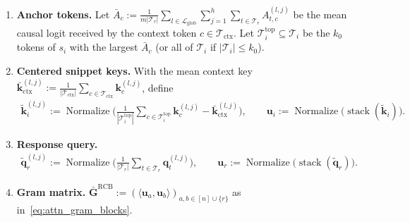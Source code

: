 \documentclass{article}
\begin{document}
\begin{enumerate}
    \item \textbf{Anchor tokens.} Let $\bar{A}_c := \frac{1}{m |\mathcal{T}_r|} \sum_{l \in \mathcal{L}_{\text{glob}}} \sum_{j=1}^{h} \sum_{t \in \mathcal{T}_r} A^{(l,j)}_{t,c}$ be the mean causal logit received by the context token $c \in \mathcal{T}_{\text{ctx}}$. Let $\mathcal{T}_i^{\text{top}} \subseteq \mathcal{T}_i$ be the $k_0$ tokens of $s_i$ with the largest $\bar{A}_c$ (or all of $\mathcal{T}_i$ if $|\mathcal{T}_i| \le k_0$).
    \item \textbf{Centered snippet keys.} With the mean context key $\bar{\mathbf{k}}_{\text{ctx}}^{(l,j)} := \frac{1}{|\mathcal{T}_{\text{ctx}}|} \sum_{c \in \mathcal{T}_{\text{ctx}}} \mathbf{k}_c^{(l,j)}$, define
    \begin{align}
        \tilde{\mathbf{k}}_i^{(l,j)} := \operatorname{Normalize}\Big( \frac{1}{|\mathcal{T}_i^{\text{top}}|} \sum_{c \in \mathcal{T}_i^{\text{top}}} \mathbf{k}_c^{(l,j)} - \bar{\mathbf{k}}_{\text{ctx}}^{(l,j)} \Big), \qquad \mathbf{u}_i := \operatorname{Normalize}\big( \operatorname{stack}(\tilde{\mathbf{k}}_i) \big).
    \end{align}
    \item \textbf{Response query.}
    \begin{align}
        \tilde{\mathbf{q}}_r^{(l,j)} := \operatorname{Normalize}\Big( \frac{1}{|\mathcal{T}_r|} \sum_{t \in \mathcal{T}_r} \mathbf{q}_t^{(l,j)} \Big), \qquad \mathbf{u}_r := \operatorname{Normalize}\big( \operatorname{stack}(\tilde{\mathbf{q}}_r) \big).
    \end{align}
    \item \textbf{Gram matrix.} $\bar{\mathbf{G}}^{\text{RCB}} := (\langle \mathbf{u}_a, \mathbf{u}_b \rangle)_{a,b \in [n] \cup \{r\}}$ as in~\eqref{eq:attn_gram_blocks}.
\end{enumerate}
\end{document}
